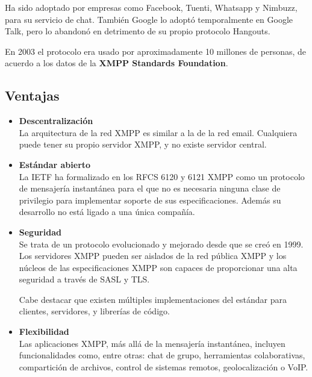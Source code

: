 \documentclass[a4paper, 11pt]{article} %
\begin{document}
  Ha sido adoptado por empresas como Facebook, Tuenti, Whatsapp y Nimbuzz, para
  su servicio de chat. También Google lo adoptó temporalmente en Google 
  Talk, pero lo abandonó en detrimento de su propio protocolo Hangouts.

  En 2003 el protocolo era usado por aproximadamente 10 millones de personas,
  de acuerdo a los datos de la \textbf{XMPP Standards Foundation}.
   
   \subsection{Ventajas}
   \begin{itemize}
     \item \textbf{Descentralización}\\
     La arquitectura de la red XMPP es similar a la de la red email. Cualquiera
     puede tener su propio servidor XMPP, y no existe servidor central.
     
     \item \textbf{Estándar abierto}\\
     La IETF ha formalizado en los RFCS 6120 y 6121 XMPP como un protocolo de 
     mensajería instantánea para el que no es necesaria ninguna clase de privilegio
     para implementar soporte de sus especificaciones. Además su desarrollo no 
     está ligado a una única compañía.
     
     \item \textbf{Seguridad}\\
     Se trata de un protocolo evolucionado y mejorado desde que se creó en 1999. 
     Los servidores XMPP pueden ser aislados de la red pública XMPP y los núcleos
     de las especificaciones XMPP son capaces de proporcionar una alta seguridad
     a través de SASL y TLS.
     
     Cabe destacar que existen múltiples implementaciones del estándar para clientes,
     servidores, y librerías de código.
     
     \item \textbf{Flexibilidad}\\
     Las aplicaciones XMPP, más allá de la mensajería instantánea, incluyen funcionalidades
     como, entre otras: chat de grupo, herramientas colaborativas, compartición de archivos, 
     control de sistemas remotos, geolocalización o VoIP.
   \end{itemize}
 
\end{document}

